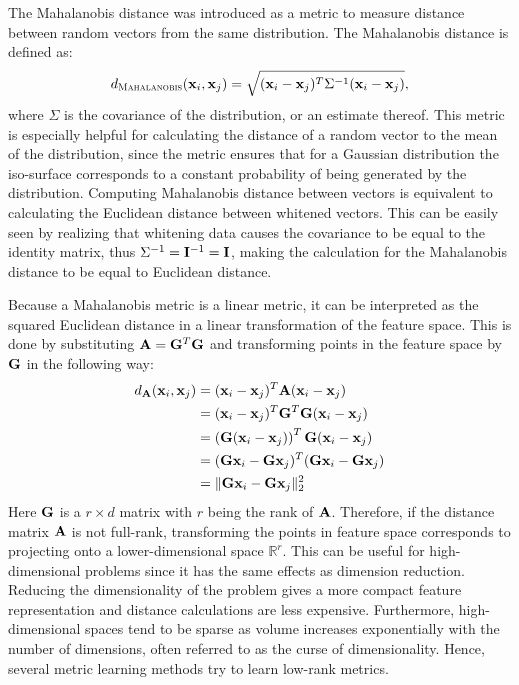 \begin{textbox}
The Mahalanobis distance was introduced as a metric to measure distance between random vectors from the same distribution. \cite{mahalanobis1936generalised} The Mahalanobis distance is defined as:
\begin{equation}
d_{\textsc{Mahalanobis}}(\vec{x}_i, \vec{x}_j) = \sqrt{(\vec{x}_i - \vec{x}_j)^T\Sigma^{-1}(\vec{x}_i - \vec{x}_j)},
\end{equation}
where $\Sigma$ is the covariance of the distribution, or an estimate thereof. This metric is especially helpful for calculating the distance of a random vector to the mean of the distribution, since the metric ensures that for a Gaussian distribution the iso-surface corresponds to a constant probability of being generated by the distribution. Computing Mahalanobis distance between vectors is equivalent to calculating the Euclidean distance between whitened vectors. This can be easily seen by realizing that whitening data causes the covariance to be equal to the identity matrix, thus $\Sigma^{-1} = \mat{I}^{-1} = \mat{I}$, making the calculation for the Mahalanobis distance to be equal to Euclidean distance.
\caption{}
\label{tb:mahalanobis}
\end{textbox}

Because a Mahalanobis metric is a linear metric, it can be interpreted as the squared Euclidean distance in a linear transformation of the feature space. This is done by substituting $\mat{A} = \mat{G}^T\mat{G}$ and transforming points in the feature space by $\mat{G}$ in the following way:
\begin{align}
d_{\mat{A}}(\vec{x}_i, \vec{x}_j) & = (\vec{x}_i - \vec{x}_j)^T\mat{A}(\vec{x}_i - \vec{x}_j) \nonumber \\
& = (\vec{x}_i - \vec{x}_j)^T\mat{G}^T\mat{G}(\vec{x}_i - \vec{x}_j) \nonumber \\
& = \left(\mat{G}(\vec{x}_i - \vec{x}_j)\right)^T \mat{G}(\vec{x}_i - \vec{x}_j) \nonumber \\
& = (\mat{G}\vec{x}_i - \mat{G}\vec{x}_j)^T(\mat{G}\vec{x}_i - \mat{G}\vec{x}_j) \nonumber \\
& = \|\mat{G}\vec{x}_i - \mat{G}\vec{x}_j\|_2^2
\end{align}
Here $\mat{G}$ is a $r \times d$ matrix with $r$ being the rank of $\mat{A}$.  Therefore, if the distance matrix $\mat{A}$ is not full-rank, transforming the points in feature space corresponds to projecting onto a lower-dimensional space $\mathbb{R}^r$. This can be useful for high-dimensional problems since it has the same effects as dimension reduction. Reducing the dimensionality of the problem gives a more compact feature representation and distance calculations are less expensive. Furthermore, high-dimensional spaces tend to be sparse as volume increases exponentially with the number of dimensions, often referred to as the curse of dimensionality. Hence, several metric learning methods try to learn low-rank metrics.

